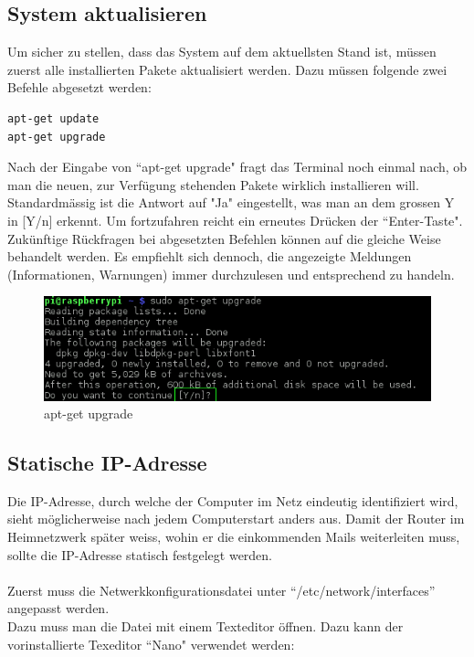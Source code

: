 \subsection{System aktualisieren}
Um sicher zu stellen, dass das System auf dem aktuellsten Stand ist, müssen zuerst alle installierten Pakete aktualisiert werden. Dazu müssen folgende zwei Befehle abgesetzt werden:

\begin{lstlisting}
apt-get update
apt-get upgrade
\end{lstlisting}

Nach der Eingabe von ``apt-get upgrade" fragt das Terminal noch einmal nach, ob man die neuen, zur Verfügung stehenden Pakete wirklich installieren will. Standardmässig ist die Antwort auf "Ja" eingestellt, was man an dem grossen Y in [Y/n] erkennt. Um fortzufahren reicht ein erneutes Drücken der ``Enter-Taste". Zukünftige Rückfragen bei abgesetzten Befehlen können auf die gleiche Weise behandelt werden. Es empfiehlt sich dennoch, die angezeigte Meldungen (Informationen, Warnungen) immer durchzulesen und entsprechend zu handeln.

\begin{figure}[h]
\centering
\includegraphics[scale=0.7]{images/upgrade}
\caption{apt-get upgrade}
\end{figure}

\subsection{Statische IP-Adresse}
Die IP-Adresse, durch welche der Computer im Netz eindeutig identifiziert wird, sieht möglicherweise nach jedem Computerstart anders aus. Damit der Router im Heimnetzwerk später weiss, wohin er die einkommenden Mails weiterleiten muss, sollte die IP-Adresse statisch festgelegt werden.
\\
\\
Zuerst muss die Netwerkkonfigurationsdatei unter ``/etc/network/interfaces'' angepasst werden.
\\
Dazu muss man die Datei mit einem Texteditor öffnen. Dazu kann der vorinstallierte Texeditor ``Nano" verwendet werden:

